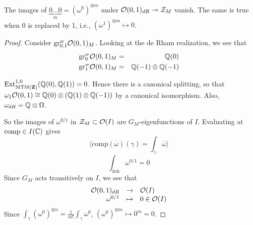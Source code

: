 \begin{lemma}
The images of $\underbrace{0 \ldots 0}_m = (\omega^0)^{\otimes m}$ under $\mathcal{O}(0,1)_{dR} \twoheadrightarrow \mathcal{Z}_M$ vanish. The same is true when 0 is replaced by 1, i.e., $(\omega^1)^{\otimes m} \mapsto 0$.
\end{lemma}
\begin{proof}
Consider $\mathrm{gr}_{0,1}^w \mathcal{O}(0,1)_M$. Looking at the de Rham realization, we see that
\begin{eqnarray*}
\mathrm{gr}_0^w \mathcal{O}(0,1)_M & = & \mathbb{Q}(0) \\
\mathrm{gr}_1^w \mathcal{O}(0,1)_M & = & \mathbb{Q}(-1) \oplus \mathbb{Q}(-1)
\end{eqnarray*}

$\mathrm{Ext}^{1,0}_{\mathrm{MTM}(\mathbf{Z})}(\mathbb{Q}(0),\mathbb{Q}(1)) = 0$. Hence there is a canonical splitting, so that $\omega_1\mathcal{O}(0,1) \cong \mathbb{Q}(0) \otimes (\mathbb{Q}(1) \otimes \mathbb{Q}(-1))$ by a canonical isomorphism. Also, $\omega_{dR} = \mathbb{Q} \otimes \Omega$.

So the images of $\omega^{0/1}$ in $\mathcal{Z}_M \subset \mathcal{O}(I)$ are $G_M$-eigenfunctions of $I$. Evaluating at $\mathrm{comp} \in I(\mathbb{C})$ gives
\[
\langle \mathrm{comp}(\overline{\omega})(\gamma) = \int_{\gamma} \overline{\omega} \rangle
\]
\[
\int_{\mathrm{dch}} \omega^{0/1} = 0
\]
Since $G_M$ acts transitively on $I$, we see that 
\[
\begin{array}{rcl}
\mathcal{O}(0,1)_{dR} & \to & \mathcal{O}(I) \\
\omega^{0/1} & \mapsto & 0 \in \mathcal{O}(I)
\end{array}
\]
Since $\int_{\gamma}(\omega^0)^{\otimes n} = \frac{1}{m!}\int_{\gamma} \omega^0$, $(\omega^0)^{\otimes m} \mapsto 0^m = 0$.
\end{proof}

